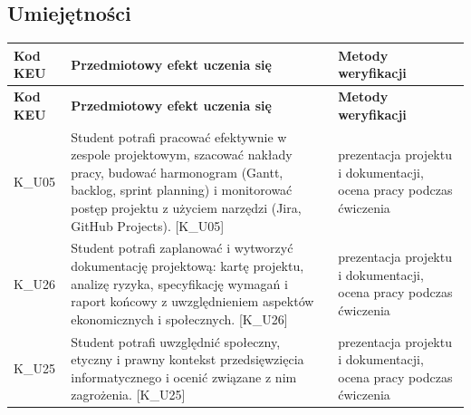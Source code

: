 \documentclass[12pt, a4paper]{article}
\newcommand{\thdrule}{\noalign{\global\setlength{\extrarowheight}{0pt}}}
\newcommand{\thdend}{\noalign{\global\setlength{\extrarowheight}{3pt}}}
\begin{document}
\subsection*{Umiejętności}
{\scriptsize
\begin{longtable}{m{1.6cm}m{9.0cm}m{4.2cm}}
\thdrule\toprule
\rowcolor{pjatkRed} {\color{white}\footnotesize\textbf{\vphantom{Ag}Kod KEU}} & {\color{white}\footnotesize\textbf{\vphantom{Ag}Przedmiotowy efekt uczenia się}} & {\color{white}\footnotesize\textbf{\vphantom{Ag}Metody weryfikacji}} \\
\midrule\thdend
\endfirsthead
\thdrule\toprule
\rowcolor{pjatkRed} {\color{white}\footnotesize\textbf{\vphantom{Ag}Kod KEU}} & {\color{white}\footnotesize\textbf{\vphantom{Ag}Przedmiotowy efekt uczenia się}} & {\color{white}\footnotesize\textbf{\vphantom{Ag}Metody weryfikacji}} \\
\midrule\thdend
\endhead
  \rowcolor{tableRowLight} K\_U05 & Student potrafi pracować efektywnie w zespole projektowym, szacować nakłady pracy, budować harmonogram (Gantt, backlog, sprint planning) i monitorować postęp projektu z użyciem narzędzi (Jira, GitHub Projects). {[}K\_U05{]} & prezentacja projektu i dokumentacji, ocena pracy podczas ćwiczenia \\
  \rowcolor{tableRowAlt} K\_U26 & Student potrafi zaplanować i wytworzyć dokumentację projektową: kartę projektu, analizę ryzyka, specyfikację wymagań i raport końcowy z uwzględnieniem aspektów ekonomicznych i społecznych. {[}K\_U26{]} & prezentacja projektu i dokumentacji, ocena pracy podczas ćwiczenia \\
  \rowcolor{tableRowLight} K\_U25 & Student potrafi uwzględnić społeczny, etyczny i prawny kontekst przedsięwzięcia informatycznego i ocenić związane z nim zagrożenia. {[}K\_U25{]} & prezentacja projektu i dokumentacji, ocena pracy podczas ćwiczenia \\
\bottomrule
\end{longtable}}
\end{document}
